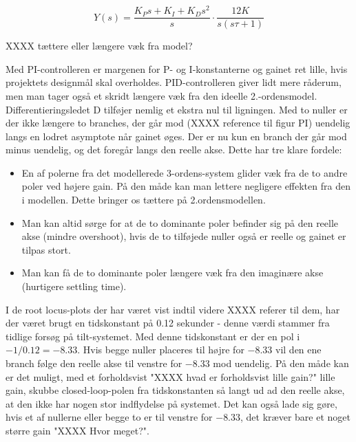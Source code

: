 \begin{equation}\label{eq:PID_OpenLoop}
Y(s)=\frac{K_{P}s+K_{I}+K_{D}s^2}{s}\cdot\frac{12K}{s(s\tau+1)}
\end{equation}


XXXX tættere eller længere væk fra model?

Med PI-controlleren er margenen for P- og I-konstanterne og gainet ret lille, hvis projektets designmål skal overholdes. PID-controlleren giver lidt mere råderum, men man tager også et skridt længere væk fra den ideelle 2.-ordensmodel. Differentieringsledet D tilføjer nemlig et ekstra nul til ligningen. Med to nuller er der ikke længere to branches, der går mod (XXXX reference til figur PI) uendelig langs en lodret asymptote når gainet øges. Der er nu kun en branch der går mod minus uendelig, og det foregår langs den reelle akse. Dette har tre klare fordele:

\begin{itemize}[noitemsep]
	\item 	En af polerne fra det modellerede 3-ordens-system glider væk fra de to andre poler ved højere gain. På den måde kan man lettere negligere effekten fra den i modellen. Dette bringer os tættere på 2.ordensmodellen.
	\item  	Man kan altid sørge for at de to dominante poler befinder sig på den 				   	reelle akse (mindre overshoot), hvis de to tilføjede nuller også er reelle og gainet er tilpas stort. 
	\item  	Man kan få de to dominante poler længere væk fra den imaginære akse 					(hurtigere settling time).
\end{itemize}

I de root locus-plots der har været vist indtil videre XXXX referer til dem, har der været brugt en tidskonstant på 0.12 sekunder - denne værdi stammer fra tidlige forsøg på tilt-systemet. Med denne tidskonstant er der en pol i $-1/0.12=-8.33$. Hvis begge nuller placeres til højre for $-8.33$ vil den ene branch følge den reelle akse til venstre for $-8.33$ mod uendelig. På den måde kan er det muligt, med et forholdsvist "XXXX hvad er forholdsvist lille gain?" lille gain, skubbe closed-loop-polen fra tidskonstanten så langt ud ad den reelle akse, at den ikke har nogen stor indflydelse på systemet. Det kan også lade sig gøre, hvis et af nullerne eller begge to er til venstre for $-8.33$, det kræver bare et noget større gain "XXXX Hvor meget?".

